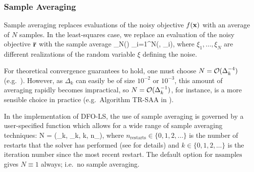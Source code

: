 \subsubsection{Sample Averaging} \label{sec_averaging_description}
Sample averaging replaces evaluations of the noisy objective $f(\mathbf{x})$  with an average of $N$ samples. In the least-squares
case, we replace an evaluation of the noisy objective $\overline{\mathbf{r}}$ with the sample average
\be \overline{\br}_N(\bx)  {}\sum_{i=1}^{N}\br(\bx, \xi_i), \ee
where $\xi_1, \ldots, \xi_N$ are different realizations of the random variable $\xi$ defining the noise.

For theoretical convergence guarantees to hold, one must choose $N=\mathcal{O}(\Delta_k^{-4})$ (e.g.~\cite{Chen2016}).
However, as $\Delta_k$ can easily be of size $10^{-2}$ or $10^{-3}$, this amount of averaging rapidly becomes impractical, so $N=\mathcal{O}(\Delta_k^{-1})$, for instance, is a more sensible choice in practice (e.g.~Algorithm TR-SAA in \cite{Chen2016}).

In the implementation of DFO-LS, the use of sample averaging is governed by a user-specified function which allows for a wide range of sample averaging techniques:
\be N = (\rho_k, \Delta_k, k, n_{}), \label{eq_nsamples} \ee
where $n_{\mathrm{restarts}}\in\{0,1,2,\ldots\}$ is the number of restarts that the solver has performed (see  for details) and $k\in\{0,1,2,\ldots\}$ is the iteration number since the most recent restart.
The default option for $\mathrm{nsamples}$ gives $N\equiv 1$ always; i.e.~no sample averaging.

